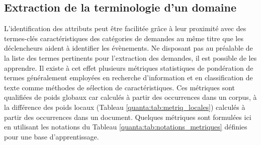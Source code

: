\subsection{Extraction de la terminologie d'un domaine}
L'identification des attributs peut être facilitée grâce à leur proximité avec des termes-clés caractéristiques des catégories de demandes au même titre que les \og déclencheurs \fg{} aident à identifier les évènements.
Ne disposant pas au préalable de la liste des termes pertinents pour l'extraction des demandes, il est possible de les apprendre. Il existe à cet effet plusieurs métriques statistiques de pondération de termes généralement  employées en recherche d'information et en classification de texte comme méthodes de sélection de caractéristiques. Ces métriques sont qualifiées de poids globaux car calculés à partir des occurrences dans un corpus, à la différence des poids locaux (Tableau \ref{quanta:tab:metriq_locales}) calculés à partir des occurrences dans un document. Quelques métriques sont formulées ici en utilisant les notations du Tableau \ref{quanta:tab:notations_metriques} définies pour une base d'apprentissage.



